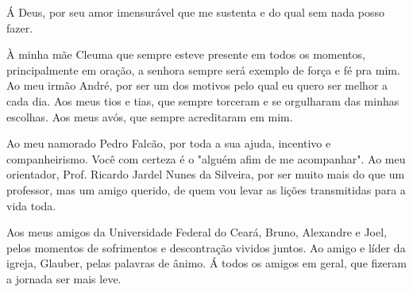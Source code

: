 Á Deus, por seu amor imensurável que me sustenta e do qual sem nada posso fazer.

À minha mãe Cleuma que sempre esteve presente em todos os momentos, principalmente em oração, a senhora sempre será exemplo de força e fé pra mim. Ao meu irmão André, por ser um dos motivos pelo qual eu quero ser melhor a cada dia. Aos meus tios e tias, que sempre torceram e se orgulharam das minhas escolhas. Aos meus avós, que sempre acreditaram em mim. 

Ao meu namorado Pedro Falcão, por toda a sua ajuda, incentivo e companheirismo. Você com certeza é o "alguém afim de me acompanhar". Ao meu orientador, Prof. Ricardo Jardel Nunes da Silveira, por ser muito mais do que um professor, mas um amigo querido, de quem vou levar as lições transmitidas para a vida toda.

Aos meus amigos da Universidade Federal do Ceará, Bruno, Alexandre e Joel, pelos momentos de sofrimentos e descontração vividos juntos. Ao amigo e líder da igreja, Glauber, pelas palavras de ânimo. Á todos os amigos em geral, que fizeram a jornada ser mais leve.  

